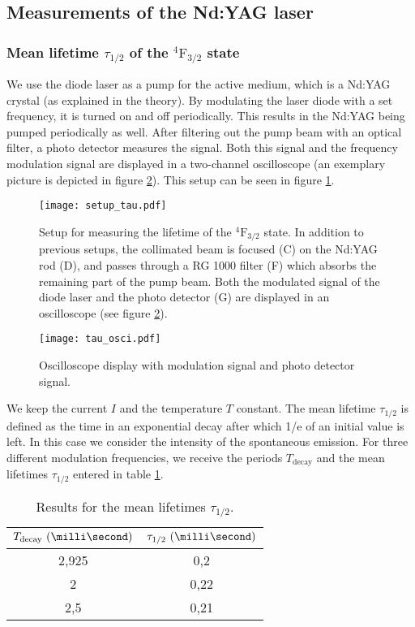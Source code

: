 \subsection{Measurements of the Nd:YAG laser}
\subsubsection{Mean lifetime $\tau_{1/2}$ of the $^4\mathrm{F}_{3/2}$ state}
We use the diode laser as a pump for the active medium, which is a Nd:YAG crystal (as explained in the theory). By modulating the laser diode with a set frequency, it is turned on and off periodically. This results in the Nd:YAG being pumped periodically as well. After filtering out the pump beam with an optical filter, a photo detector measures the signal. Both this signal and the frequency modulation signal are displayed in a two-channel oscilloscope (an exemplary picture is depicted in figure \ref{fig:tau_osci}). This setup can be seen in figure \ref{fig:setup_tau}.

\begin{figure}
	\centering
	\texttt{[image: setup\_tau.pdf]}
	\caption[Setup for measuring the lifetime of the $^4\mathrm{F}_{3/2}$ state]{Setup for measuring the lifetime of the $^4\mathrm{F}_{3/2}$ state. In addition to previous setups, the collimated beam is focused (C) on the Nd:YAG rod (D), and passes through a RG 1000 filter (F) which absorbs the remaining part of the pump beam. Both the modulated signal of the diode laser and the photo detector (G) are displayed in an oscilloscope (see figure \ref{fig:tau_osci}). \cite{lit:manual}}
	\label{fig:setup_tau}
\end{figure}

\begin{figure}[h]
	\centering
	\texttt{[image: tau\_osci.pdf]}
	\caption[Mean lifetime: Oscilloscope]{Oscilloscope display with modulation signal and photo detector signal. \cite{lit:manual}}
	\label{fig:tau_osci}
\end{figure}

We keep the current $I$ and the temperature $T$ constant. The mean lifetime $\tau_{1/2}$ is defined as the time in an exponential decay after which 1/e of an initial value is left. In this case we consider the intensity of the spontaneous emission. For three different modulation frequencies, we receive the periods $T_\text{decay}$ and the mean lifetimes $\tau_{1/2}$ entered in table \ref{tab:tau}.

\begin{table}[h]
	\centering
	\caption{Results for the mean lifetimes $\tau_{1/2}$.}
	\begin{tabular}{|c|c|}
	\hline
	$T_\text{decay}~(\milli\second)$ & $\tau_{1/2}~(\milli\second)$\\
	\hline
	2,925	& 0,2\\
	2	& 0,22\\
	2,5 &	0,21\\
	\hline
	\end{tabular}
	\label{tab:tau}
\end{table}

